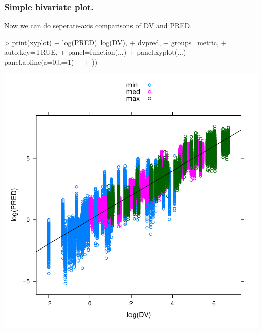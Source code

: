 \subsubsection{Simple bivariate plot.}
Now we can do seperate-axis comparisons of DV and PRED.
\begin{Schunk}
\begin{Sinput}
> print(xyplot(
+ 	log(PRED)~log(DV),
+ 	dvpred,
+ 	groups=metric,
+ 	auto.key=TRUE,
+ 	panel=function(...){
+ 		panel.xyplot(...)
+ 		panel.abline(a=0,b=1)
+ 	}
+ ))
\end{Sinput}
\end{Schunk}
\includegraphics{model1-groupLogLog}
